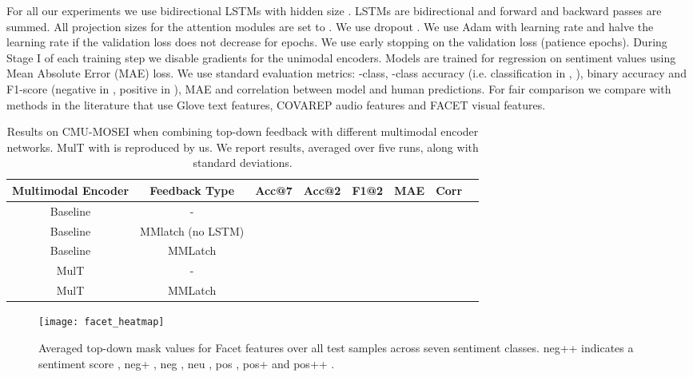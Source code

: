 \documentclass{article}
\begin{document}
For all our experiments we use bidirectional LSTMs with hidden size .
LSTMs are bidirectional and forward and backward passes are summed.
All projection sizes for the attention modules are set to . 
We use dropout .
We use Adam \cite{adam14} with learning rate  and halve the learning rate if the validation loss does not decrease for  epochs.
We use early stopping on the validation loss (patience  epochs).
During Stage I of each training step we disable gradients for the unimodal encoders.
Models are trained for regression on sentiment values using Mean Absolute Error (MAE) loss.
We use standard evaluation metrics: -class, -class accuracy (i.e. classification in , ), binary accuracy and F1-score (negative in , positive in ), MAE and correlation between model and human predictions.
For fair comparison we compare with methods in the literature that use Glove text features, COVAREP audio features and FACET visual features.













\begin{table*}[h]
    \centering
    \small
    \begin{tabular}{|c|c|c|c|c|c|c|c|}
      \hline
     Multimodal Encoder & Feedback Type & Acc@7  & Acc@2 & F1@2  & MAE & Corr \\\hline\hline
Baseline & - &   &  &  &  &  \\
Baseline & MMlatch (no LSTM) &  &  &  &  &  \\ 
Baseline & MMLatch &  &  &  &  & \\ \hline
MulT & - &  &   &  &  &  \\ 
MulT & MMLatch &  &  &   &  &  \\  \hline
    \end{tabular}
    \caption{Results on CMU-MOSEI when combining top-down feedback with different multimodal encoder networks.  MulT with  is reproduced by us. We report results, averaged over five runs, along with standard deviations.}
    \label{tab:mult}
\end{table*}


\begin{figure*}[h]
\centering
\texttt{[image: facet\_heatmap]}

\caption{Averaged top-down mask values for Facet features over all test samples across seven sentiment classes. neg++ indicates a sentiment score , neg+ , neg , neu , pos , pos+  and pos++ . }
\label{fig:heatmap}
\end{figure*}
\end{document}
